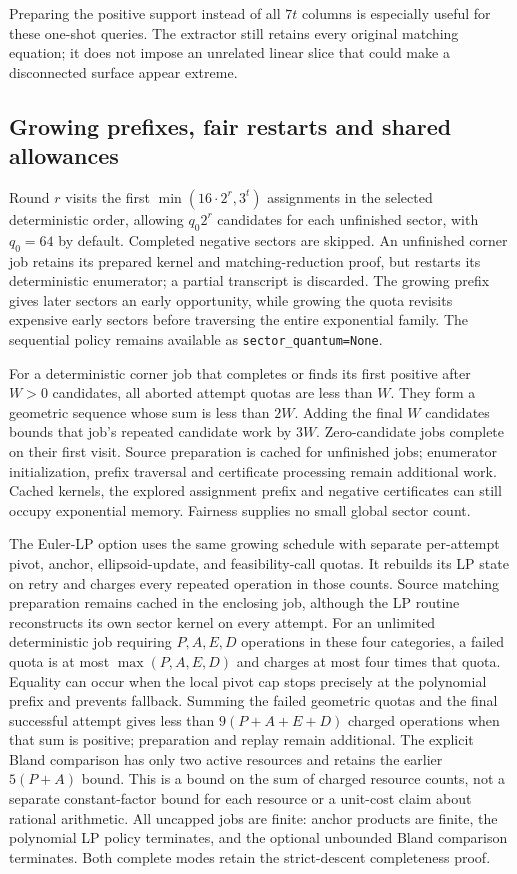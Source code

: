 Preparing the positive support instead of all $7t$ columns is especially
useful for these one-shot queries.  The extractor still retains every
original matching equation; it does not impose an unrelated linear slice
that could make a disconnected surface appear extreme.

\subsection{Growing prefixes, fair restarts and shared allowances}

Round $r$ visits the first $\min(16\cdot2^r,3^t)$ assignments in the selected
deterministic order, allowing $q_0 2^r$ candidates for each unfinished
sector, with $q_0=64$ by default.  Completed negative sectors are skipped.
An unfinished corner job retains its prepared kernel and matching-reduction
proof, but restarts its deterministic enumerator; a partial transcript is
discarded.  The growing prefix gives later sectors an early opportunity,
while growing the quota revisits expensive early sectors before traversing
the entire exponential family.  The sequential policy remains available
as \texttt{sector\_quantum=None}.

For a deterministic corner job that completes or finds its first positive
after $W>0$ candidates, all aborted attempt quotas are less than $W$.
They form a geometric sequence whose sum is less than $2W$.  Adding the
final $W$ candidates bounds that job's repeated candidate work by $3W$.
Zero-candidate jobs complete on their first visit.  Source preparation is
cached for unfinished jobs; enumerator initialization, prefix traversal
and certificate processing remain additional work.  Cached kernels, the
explored assignment prefix and negative certificates can still occupy
exponential memory.  Fairness supplies no small global sector count.

The Euler-LP option uses the same growing schedule with separate per-attempt
pivot, anchor, ellipsoid-update, and feasibility-call quotas.  It rebuilds
its LP state on retry and charges every repeated operation in those counts.
Source matching preparation remains cached in the enclosing job, although
the LP routine reconstructs its own sector kernel on every attempt.
For an unlimited deterministic job requiring $P,A,E,D$ operations in these
four categories, a failed quota is at most $\max(P,A,E,D)$ and charges at
most four times that quota.  Equality can occur when the local pivot cap
stops precisely at the polynomial prefix and prevents fallback.  Summing
the failed geometric quotas and the final successful attempt gives less
than $9(P+A+E+D)$ charged operations when that sum is positive; preparation
and replay remain additional.  The explicit Bland comparison has only two
active resources and retains the earlier $5(P+A)$ bound.  This is a bound
on the sum of charged resource counts, not a separate constant-factor bound
for each resource or a unit-cost claim about rational arithmetic.
All uncapped jobs are finite: anchor products are finite, the polynomial
LP policy terminates, and the optional unbounded Bland comparison terminates.
Both complete modes retain the strict-descent completeness proof.

